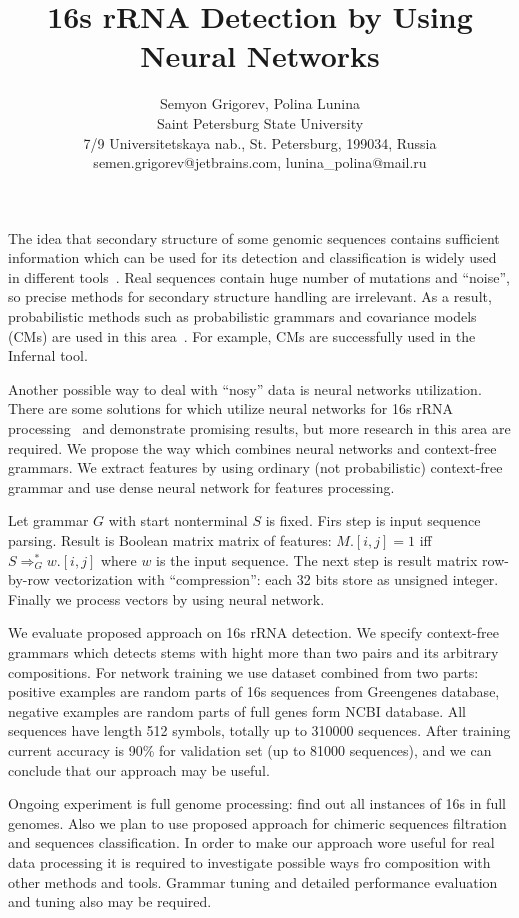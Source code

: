 \documentclass[12pt]{article}  %
\title{16s rRNA Detection by Using Neural Networks}
\author{Semyon Grigorev, Polina Lunina
\\
       {Saint Petersburg State University}\\
       {7/9 Universitetskaya nab., St. Petersburg, 199034, Russia}\\
       semen.grigorev@jetbrains.com, lunina\_polina@mail.ru
       }
\date{}
\theoremstyle{definition}
\theoremstyle{remark}
\begin{document}
\maketitle
The idea that secondary structure of some genomic sequences contains sufficient information which can be used for its 
detection and classification is widely used in different tools~\cite{GrammarsRNA, PCFG, meta, LWPCFG}.
Real sequences contain huge number of mutations and ``noise'', so precise methods for secondary structure handling are irrelevant.
As a result, probabilistic methods such as probabilistic grammars and covariance models (CMs) are used in this area~\cite{EddyDurbin}.
For example, CMs are successfully used in the Infernal tool.%

Another possible way to deal with ``nosy'' data is neural networks utilization. 
There are some solutions for which utilize neural networks for 16s rRNA processing~\cite{Humidor, ANN} and demonstrate promising results, but more research in this area are required.
We propose the way which combines neural networks and context-free grammars. 
We extract features by using ordinary (not probabilistic) context-free grammar and use dense neural network for features processing.

Let grammar $G$ with start nonterminal $S$ is fixed.
Firs step is input sequence parsing.
Result is Boolean matrix matrix of features: $M.[i,j]=1$ iff $S \Rightarrow^*_G w.[i,j]$ where $w$ is the input sequence.
The next step is result matrix row-by-row vectorization with ``compression'': each 32 bits store as unsigned integer.
Finally we process vectors by using neural network. 

We evaluate proposed approach on 16s rRNA detection.
We specify context-free grammars which detects stems with hight more than two pairs and its arbitrary compositions.
For network training we use dataset combined from two parts: positive examples are random parts of 16s sequences from Greengenes database, negative examples are random parts of full genes form NCBI database.%
All sequences have length 512 symbols, totally up to 310000 sequences.
After training current accuracy is 90\% for validation set (up to 81000 sequences), and we can conclude that our approach may be useful.

Ongoing experiment is full genome processing: find out all instances of 16s in full genomes.
Also we plan to use proposed approach for chimeric sequences filtration and sequences classification.
In order to make our approach wore useful for real data processing it is required to investigate possible ways fro composition with other methods and tools.
Grammar tuning and detailed performance evaluation and tuning also may be required.
\end{document}
